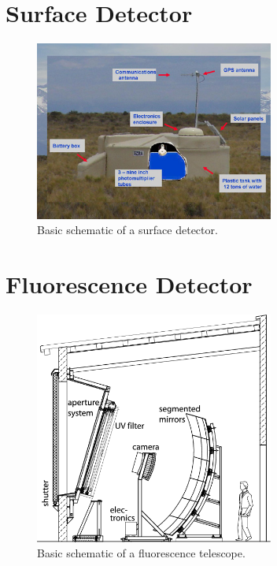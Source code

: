 \section{Surface Detector}

\begin{figure}
\centering
\includegraphics[width=0.7\textwidth]{chapters/pix/inside_surface_detector.jpg}
\caption{Basic schematic of a surface detector.}
\label{fig:SD_schematic}
\end{figure}

\section{Fluorescence Detector}

\begin{figure}
\centering
\includegraphics[width=0.7\textwidth]{chapters/pix/fluorescence_telescope.png}
\caption{Basic schematic of a fluorescence telescope.}
\label{fig:FD_schematic}
\end{figure}

